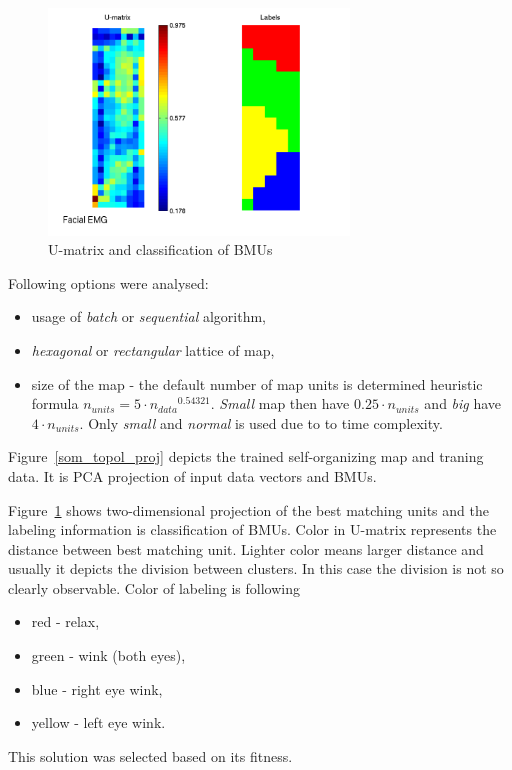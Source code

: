 \documentclass[a4paper]{IEEEtran}
\begin{document}
\begin{figure}[h]
	\centering
	\includegraphics[width=80mm]{som_umat}
	\caption{U-matrix and classification of BMUs}
	\label{som_umat}
\end{figure}

Following options were analysed:
\begin{itemize}
	\item usage of \textit{batch} or \textit{sequential} algorithm,
	\item \textit{hexagonal} or \textit{rectangular} lattice of map,
	\item size of the map - the default number of map units is determined heuristic formula 
	$ n_{units} = 5\cdot {n_{data}}^{0.54321} $. \textit{Small} map then
	have $ 0.25\cdot n_{units} $ and \textit{big} have $ 4\cdot n_{units} $. Only
	\textit{small} and \textit{normal} is used due to to time complexity.
\end{itemize}

Figure~\ref{som_topol_proj} depicts the trained self-organizing map and traning data.
It is PCA projection of input data vectors and BMUs.

Figure~\ref{som_umat} shows two-dimensional projection of the best matching units and
the labeling information is classification of BMUs. 
Color in U-matrix represents the distance between best matching unit. Lighter color
means larger distance and usually it depicts the division between clusters. In this case
the division is not so clearly observable. Color of labeling is following
\begin{itemize}
	\item  red - relax,
	\item green - wink (both eyes),
	\item blue - right eye wink,
	\item yellow - left eye wink.
\end{itemize}

This solution was selected based on
its fitness. %
\end{document}
